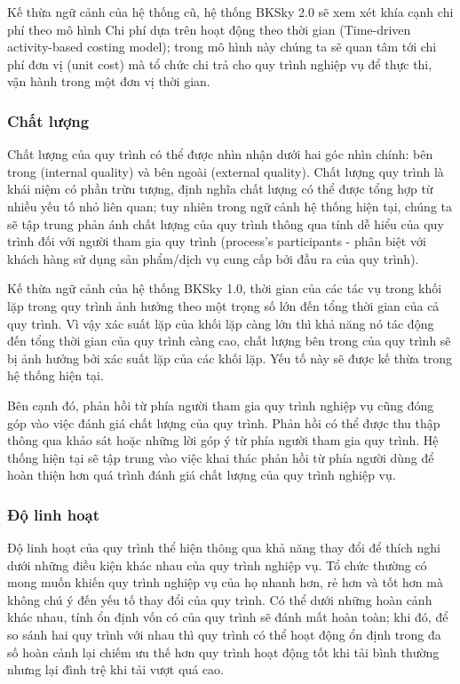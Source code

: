     Kế thừa ngữ cảnh của hệ thống cũ, hệ thống BKSky 2.0 sẽ xem xét khía cạnh chi phí theo mô hình Chi phí dựa trên hoạt động theo thời gian (Time-driven activity-based costing model); trong mô hình này chúng ta sẽ quan tâm tới chi phí đơn vị (unit cost) mà tổ chức chi trả cho quy trình nghiệp vụ để thực thi, vận hành trong một đơn vị thời gian.
    \subsubsection{Chất lượng}

    Chất lượng của quy trình có thể được nhìn nhận dưới hai góc nhìn chính: bên trong (internal quality) và bên ngoài (external quality). Chất lượng quy trình là khái niệm có phần trừu tượng, định nghĩa chất lượng có thể được tổng hợp từ nhiều yếu tố nhỏ liên quan; tuy nhiên trong ngữ cảnh hệ thống hiện tại, chúng ta sẽ tập trung phản ánh chất lượng của quy trình thông qua tính dễ hiểu của quy trình đối với người tham gia quy trình (process's participants - phân biệt với khách hàng sử dụng sản phẩm/dịch vụ cung cấp bởi đầu ra của quy trình).
    
    Kế thừa ngữ cảnh của hệ thống BKSky 1.0, thời gian của các tác vụ trong khối lặp trong quy trình ảnh hưởng theo một trọng số lớn đến tổng thời gian của cả quy trình. Vì vậy xác suất lặp của khối lặp càng lớn thì khả năng nó tác động đến tổng thời gian của quy trình càng cao, chất lượng bên trong của quy trình sẽ bị ảnh hưởng bởi xác suất lặp của các khối lặp. Yếu tố này sẽ được kế thừa trong hệ thống hiện tại.

    Bên cạnh đó, phản hồi từ phía người tham gia quy trình nghiệp vụ cũng đóng góp vào việc đánh giá chất lượng của quy trình. Phản hồi có thể được thu thập thông qua khảo sát hoặc những lời góp ý từ phía người tham gia quy trình. Hệ thống hiện tại sẽ tập trung vào việc khai thác phản hồi từ phía người dùng để hoàn thiện hơn quá trình đánh giá chất lượng của quy trình nghiệp vụ.
    \subsubsection{Độ linh hoạt}

    Độ linh hoạt của quy trình thể hiện thông qua khả năng thay đổi để thích nghi dưới những điều kiện khác nhau của quy trình nghiệp vụ. Tổ chức thường có mong muốn khiến quy trình nghiệp vụ của họ nhanh hơn, rẻ hơn và tốt hơn mà không chú ý đến yếu tố thay đổi của quy trình. Có thể dưới những hoàn cảnh khác nhau, tính ổn định vốn có của quy trình sẽ đánh mất hoàn toàn; khi đó, để so sánh hai quy trình với nhau thì quy trình có thể hoạt động ổn định trong đa số hoàn cảnh lại chiếm ưu thế hơn quy trình hoạt động tốt khi tải bình thường nhưng lại đình trệ khi tải vượt quá cao.

